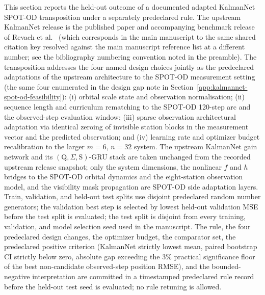 \documentclass{article}
\begin{document}
This section reports the held-out outcome of a documented adapted KalmanNet SPOT-OD transposition under a separately predeclared rule. The upstream KalmanNet release is the published paper and accompanying benchmark release of Revach et al.\ \cite{revach2022kalmannet} (which corresponds in the main manuscript to the same shared citation key resolved against the main manuscript reference list at a different number; see the bibliography numbering convention noted in the preamble). The transposition addresses the four named design choices jointly as the predeclared adaptations of the upstream architecture to the SPOT-OD measurement setting (the same four enumerated in the design gap note in Section~\ref{app:kalmannet-spot-od-feasibility}): (i) orbital scale state and observation normalisation; (ii) sequence length and curriculum rematching to the SPOT-OD 120-step arc and the observed-step evaluation window; (iii) sparse observation architectural adaptation via identical zeroing of invisible station blocks in the measurement vector and the predicted observation; and (iv) learning rate and optimizer budget recalibration to the larger $m=6$, $n=32$ system. The upstream KalmanNet gain network and its $(\mathrm{Q},\Sigma,\mathrm{S})$-GRU stack are taken unchanged from the recorded upstream release snapshot; only the system dimensions, the nonlinear $f$ and $h$ bridges to the SPOT-OD orbital dynamics and the eight-station observation model, and the visibility mask propagation are SPOT-OD side adaptation layers. Train, validation, and held-out test splits use disjoint predeclared random number generators; the validation best step is selected by lowest held-out validation MSE before the test split is evaluated; the test split is disjoint from every training, validation, and model selection seed used in the manuscript. The rule, the four predeclared design changes, the optimizer budget, the comparator set, the predeclared positive criterion (KalmanNet strictly lowest mean, paired bootstrap CI strictly below zero, absolute gap exceeding the 3\% practical significance floor of the best non-candidate observed-step position RMSE), and the bounded-negative interpretation are committed in a timestamped predeclared rule record before the held-out test seed is evaluated; no rule retuning is allowed.
\end{document}
